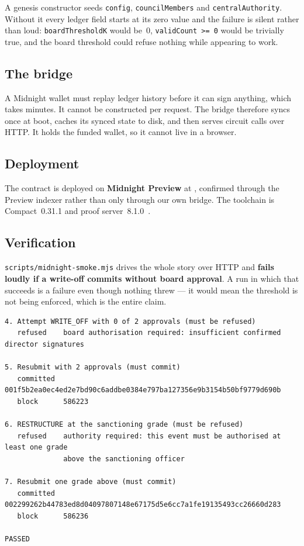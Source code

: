 \documentclass[11pt,a4paper]{article}
\begin{document}
\vspace{4pt}
A genesis constructor seeds \texttt{config}, \texttt{councilMembers} and \texttt{centralAuthority}. Without
it every ledger field starts at its zero value and the failure is silent rather than loud:
\texttt{boardThresholdK} would be~0, \texttt{validCount >= 0} would be trivially true, and the board
threshold could refuse nothing while appearing to work.

\subsection{The bridge}

A Midnight wallet must replay ledger history before it can sign anything, which takes minutes. It cannot
be constructed per request. The bridge therefore syncs once at boot, caches its synced state to disk, and
then serves circuit calls over HTTP. It holds the funded wallet, so it cannot live in a browser.

\subsection{Deployment}

The contract is deployed on \textbf{Midnight Preview} at
\texttt{}, confirmed through
the Preview indexer rather than only through our own bridge. The toolchain is Compact~0.31.1 and proof
server~8.1.0~\cite{midnightdocs,compact}.

\subsection{Verification}

\texttt{scripts/midnight-smoke.mjs} drives the whole story over HTTP and \textbf{fails loudly if a
write-off commits without board approval}. A run in which that succeeds is a failure even though nothing
threw --- it would mean the threshold is not being enforced, which is the entire claim.

\begin{Verbatim}
4. Attempt WRITE_OFF with 0 of 2 approvals (must be refused)
   refused    board authorisation required: insufficient confirmed director signatures

5. Resubmit with 2 approvals (must commit)
   committed  001f5b2ea0ec4ed2e7bd90c6addbe0384e797ba127356e9b3154b50bf9779d690b
   block      586223

6. RESTRUCTURE at the sanctioning grade (must be refused)
   refused    authority required: this event must be authorised at least one grade
              above the sanctioning officer

7. Resubmit one grade above (must commit)
   committed  002299262b44783ed8d04097807148e67175d5e6cc7a1fe19135493cc26660d283
   block      586236

PASSED
\end{Verbatim}
\end{document}
